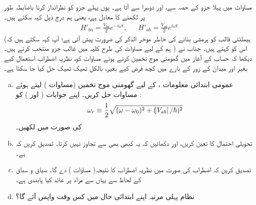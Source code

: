 مساوات   میں پہلا جزو    کے  حصہ  سے، اور  دوسرا  سے آتا ہے۔ یوں پہلے جزو کو  نظرانداز کرنا باضابطہ طور پر  لکھنے کا معادل ہے،  یعنی ہم درج ذیل کہہ سکتے ہیں۔
\begin{align}\label{مساوات_تابع_مضطرب_کوسائن_ایک_جزو}
	H'_{ba}=\frac{V_{ba}}{2}e^{-i\omega t},&&H'_{ab}=\frac{V_{ab}}{2}e^{i\omega t}
\end{align}
(ہیملٹنی قالب کو ہرمشی بنانے کی خاطر موخر الذکر کی ضرورت پیش آتی ہے؛ آپ کہہ سکتے ہیں کہ  ہم  کے لیے مساوات  کی طرح کلیہ میں غالب جزو  منتخب کرتے  ہیں۔ ) اس کو  کہتے ہیں۔ جناب  نے دیکھا کہ حساب کے آغاز میں گھومتی موج تخمین کرتے ہوئے مساوات   کو،   نظریہ اضطراب  استعمال کیے  بغیر  اور میدان کے  زور کے بارے میں کچھ  فرض کیے  بغیر،  بالکل ٹھیک ٹھیک حل کیا جا سکتا ہے۔
\begin{enumerate}[a.]
\item
 عمومی ابتدائی معلومات ،    کے لیے گھومتی موج تخمین  (مساوات )   لیتے ہوئے مساوات   حل کریں۔ اپنے جوابات (  اور )  کو : 
\begin{align}
	\omega_r\equiv\frac{1}{2}\sqrt{(\omega-\omega_0)^2+(\abs{V_{ab}}/\hslash)^2}
\end{align}
کی صورت میں لکھیں۔
\item
 تحویلی  احتمال کا  تعین کریں، اور  دکھائیں کہ یہ کبھی بھی    سے تجاوز نہیں کرتا۔ تصدیق کریں کہ        ہے۔
\item
 تصدیق کریں  کہ   اضطراب کی صورت میں   نظریہ اضطراب کا نتیجہ(  مساوات )   دے گا۔ سیاق و سباق کے لحاظ سے یہاں  سے مراد      پر عائد کیا  پابندی  ہے۔
\item
 نظام پہلی مرتبہ  اپنے ابتدائی حال میں کس وقت واپس آئے گا؟
 \end{enumerate}



